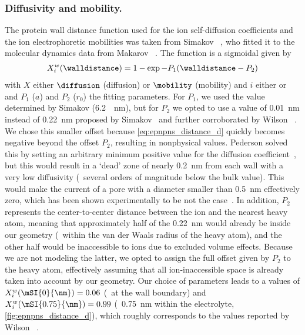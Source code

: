 \subsubsection{Diffusivity and mobility.}
%
The protein wall distance function used for the ion self-diffusion coefficients and the ion electrophoretic
mobilities was taken from Simakov \etal{}~\cite{Simakov-2010}, who fitted it to the molecular dynamics data
from Makarov \etal{}~\cite{Makarov-1998}. The function is a sigmoidal given by
%
\begin{align}\label{eq:epnpns_distance_d}
  X_{i}^w (\walldistance) = 1 - \exp{-P_1 (\walldistance - P_2)}
\end{align}
%
with $X$ either $\diffusion$ (diffusion) or $\mobility$ (mobility) and $i$ either \Na{} or \Cl{} and $P_1$
($a$) and $P_2$ ($r_0$) the fitting parameters. For $P_1$, we used the value determined by Simakov \etal{}
(\SI{6.2}{\per\nm}), but for $P_2$ we opted to use a value of \SI{0.01}{\nm} instead of \SI{0.22}{\nm}
proposed by Simakov~\cite{Simakov-2010} and further corroborated by Wilson \etal{}~\cite{Wilson-2019}. We
chose this smaller offset because \cref{eq:epnpns_distance_d} quickly becomes negative beyond the offset
$P_2$, resulting in nonphysical values. Pederson \etal{} solved this by setting an arbitrary minimum positive
value for the diffusion coefficient~\cite{Pederson-2015}, but this would result in a `dead' zone of nearly
\SI{0.2}{\nm} from each wall with a very low diffusivity (\ie~several orders of magnitude below the bulk
value). This would make the current of a pore with a diameter smaller than \SI{0.5}{\nm} effectively zero,
which has been shown experimentally to be not the case~\cite{Rigo-2019}. In addition, $P_2$ represents the
center-to-center distance between the ion and the nearest heavy atom, meaning that approximately half of the
\SI{0.22}{\nm} would already be inside our geometry (\ie~within the van der Waals radius of the heavy atom),
and the other half would be inaccessible to ions due to excluded volume effects. Because we are not modeling
the latter, we opted to assign the full offset given by $P_2$ to the heavy atom, effectively assuming that all
ion-inaccessible space is already taken into account by our geometry. Our choice of parameters leads to a
values of $X_{i}^w (\mSI{0}{\nm}) = 0.06$ (\ie~at the wall boundary) and $X_{i}^w (\mSI{0.75}{\nm}) = 0.99$
(\ie~\SI{0.75}{\nm} within the electrolyte, \cref{fig:epnpns_distance_d}), which roughly corresponds to the
values reported by Wilson \etal{}~\cite{Wilson-2019}.
%

